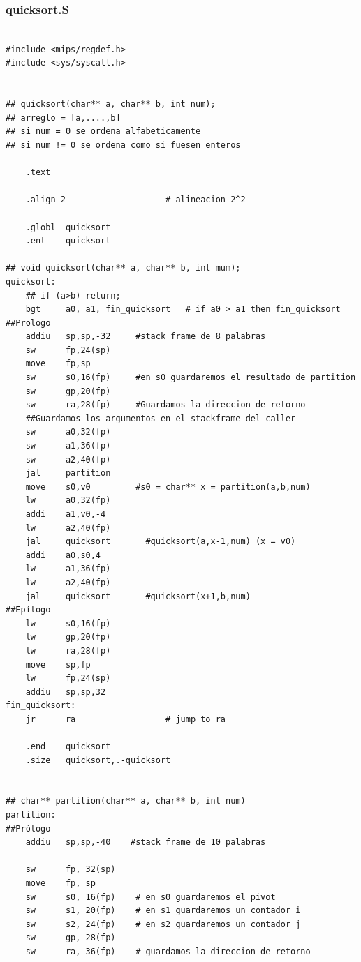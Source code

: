 \documentclass[a4paper,10pt]{article}
\numberwithin{equation}{section}
\numberwithin{figure}{section}
\begin{document}
\vspace{1.5cm}

\subsubsection{quicksort.S}


\begin{lstlisting}

#include <mips/regdef.h>
#include <sys/syscall.h>


## quicksort(char** a, char** b, int num);
## arreglo = [a,....,b]
## si num = 0 se ordena alfabeticamente
## si num != 0 se ordena como si fuesen enteros

    .text

    .align 2                    # alineacion 2^2

    .globl  quicksort
    .ent    quicksort
    
## void quicksort(char** a, char** b, int mum);
quicksort:
    ## if (a>b) return;
    bgt		a0, a1, fin_quicksort	# if a0 > a1 then fin_quicksort  
##Prologo
    addiu   sp,sp,-32     #stack frame de 8 palabras
    sw      fp,24(sp)
    move    fp,sp
    sw      s0,16(fp)     #en s0 guardaremos el resultado de partition
    sw      gp,20(fp)     
    sw      ra,28(fp)     #Guardamos la direccion de retorno
    ##Guardamos los argumentos en el stackframe del caller
    sw      a0,32(fp)
    sw      a1,36(fp)
    sw      a2,40(fp)
    jal     partition
    move    s0,v0         #s0 = char** x = partition(a,b,num)
    lw      a0,32(fp)     
    addi    a1,v0,-4
    lw      a2,40(fp)
    jal     quicksort       #quicksort(a,x-1,num) (x = v0)
    addi    a0,s0,4
    lw      a1,36(fp)
    lw      a2,40(fp)
    jal     quicksort       #quicksort(x+1,b,num)
##Epílogo
    lw      s0,16(fp)
    lw      gp,20(fp)
    lw      ra,28(fp)
    move    sp,fp
    lw      fp,24(sp)
    addiu   sp,sp,32
fin_quicksort:
    jr		ra					# jump to ra

    .end    quicksort
    .size   quicksort,.-quicksort
    
    
## char** partition(char** a, char** b, int num)
partition:
##Prólogo
    addiu   sp,sp,-40    #stack frame de 10 palabras
    
    sw      fp, 32(sp)   
    move    fp, sp
    sw		s0, 16(fp)	  # en s0 guardaremos el pivot	
    sw      s1, 20(fp)    # en s1 guardaremos un contador i
    sw      s2, 24(fp)    # en s2 guardaremos un contador j
    sw      gp, 28(fp)
    sw      ra, 36(fp)    # guardamos la direccion de retorno
    

\end{lstlisting}
\end{document}
